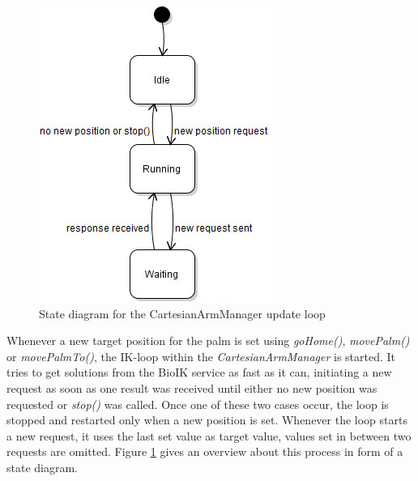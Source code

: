 \begin{figure}
	\vspace{-2.2em}
	\caption{\label{fig:impl:cartarmstate}State diagram for the CartesianArmManager update loop}
	\includegraphics[width=\linewidth]{assets/chpt_impl/sw/CartesianArmManager_loop}
\end{figure}

Whenever a new target position for the palm is set using \textit{goHome()}, \textit{movePalm()} or \textit{movePalmTo()}, the IK-loop within the \textit{CartesianArmManager} is started. It tries to get solutions from the BioIK service as fast as it can, initiating a new request as soon as one result was received until either no new position was requested or \textit{stop()} was called. Once one of these two cases occur, the loop is stopped and restarted only when a new position is set. Whenever the loop starts a new request, it uses the last set value as target value, values set in between two requests are omitted. Figure \ref{fig:impl:cartarmstate} gives an overview about this process in form of a state diagram.

